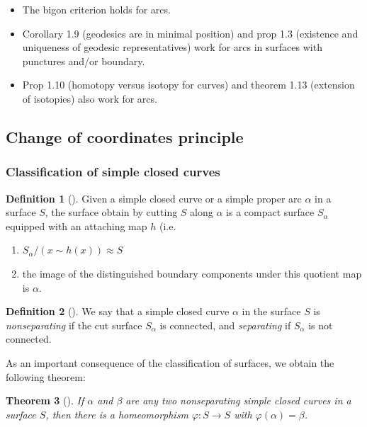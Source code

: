 \documentclass[reqno]{amsart}
\newtheorem{theorem}{Theorem}[section]
\theoremstyle{definition}
\newtheorem{definition}[theorem]{Definition}
\theoremstyle{remark}
\begin{document}
\begin{itemize}
    \item The bigon criterion holds for arcs.
    \item Corollary 1.9 (geodesics are in minimal position)
        and prop 1.3 (existence and uniqueness of geodesic 
        representatives) work for arcs in surfaces with
        punctures and/or boundary.
    \item Prop 1.10 (homotopy versus isotopy for curves) and
        theorem 1.13 (extension of isotopies) also
        work for arcs.
\end{itemize}

\subsection{Change of coordinates principle}

\subsubsection{Classification of simple closed curves}

\begin{definition}[]
    Given a simple closed curve or
    a simple proper arc $\alpha$ in a surface $S$,
    the surface obtain by cutting $S$ along $\alpha$ is
    a compact surface $S_{\alpha}$ equipped with an attaching
    map $h$ (i.e.
    \begin{enumerate}
        \item $S_{\alpha} / \left( x \sim h(x) \right) 
            \approx S$ 
        \item the image of the distinguished boundary components
            under this quotient map is $\alpha$.
    \end{enumerate}
\end{definition}

\begin{definition}[]
    We say that a simple closed curve $\alpha$ in the surface
    $S$ is \textit{nonseparating} if the cut surface
    $S_{\alpha}$ is connected, and \textit{separating} if
    $S_{\alpha}$ is not connected.
\end{definition}


As an important consequence of the classification of surfaces, we
obtain the following theorem:

\begin{theorem}[]
    If $\alpha$ and $\beta$ are any two nonseparating simple
    closed curves in a surface $S$, then there
    is a homeomorphism $\varphi \colon S \to S$ with
    $\varphi \left( \alpha \right) = \beta$.
\end{theorem}
\end{document}
